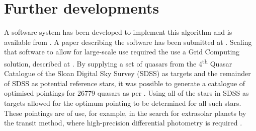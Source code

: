 \documentclass{aa}
\begin{document}
\section{Further developments}
A software system has been developed to implement this algorithm and is available from \citet{githubrepo}. A paper describing the software has been submitted at \citet{softwarepaper}. Scaling that software to allow for large-scale use required the use a Grid Computing solution, described at \citet{gridsystempaper}. By supplying a set of quasars from the 4\textsuperscript{th} Quasar Catalogue of the Sloan Digital Sky Survey (SDSS) as targets and the remainder of SDSS as potential reference stars, it was possible to generate a catalogue of optimised pointings for 26779 quasars as per \citet{quasarpaper,ZenodoQuasarCatalogue}. Using all of the stars in SDSS as targets allowed for the optimum pointing to be determined for all such stars. These pointings are of use, for example, in the search for extrasolar planets by the transit method, where high-precision differential photometry is required \citep{exopaper,ZenodoXOPCatalogue}.
\end{document}

